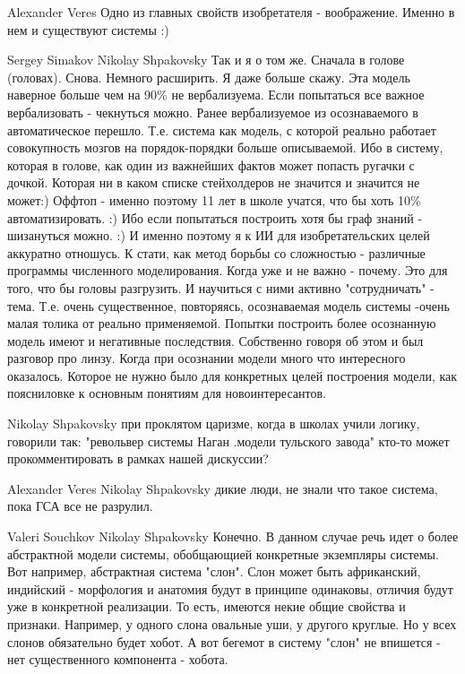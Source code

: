 \documentclass[11pt,a4paper]{article}
\begin{document}
Alexander Veres Одно из главных свойств изобретателя - воображение. Именно в
нем и существуют системы :)

Sergey Simakov Nikolay Shpakovsky Так и я о том же. Сначала в голове
(головах). Снова. Немного расширить.  Я даже больше скажу. Эта модель наверное
больше чем на 90\% не вербализуема. Если попытаться все важное вербализовать -
чекнуться можно. Ранее вербализуемое из осознаваемого в автоматическое
перешло. Т.е. система как модель, с которой реально работает совокупность
мозгов на порядок-порядки больше описываемой. Ибо в систему, которая в голове,
как один из важнейших фактов может попасть ругачки с дочкой. Которая ни в
каком списке стейхолдеров не значится и значится не может:) Оффтоп - именно
поэтому 11 лет в школе учатся, что бы хоть 10\% автоматизировать. :) Ибо если
попытаться построить хотя бы граф знаний - шизануться можно. :) И именно
поэтому я к ИИ для изобретательских целей аккуратно отношусь.  К стати, как
метод борьбы со сложностью - различные программы численного
моделирования. Когда уже и не важно - почему. Это для того, что бы головы
разгрузить. И научиться с ними активно "сотрудничать" - тема.  Т.е. очень
существенное, повторяясь, осознаваемая модель системы -очень малая толика от
реально применяемой.  Попытки построить более осознанную модель имеют и
негативные последствия. Собственно говоря об этом и был разговор про
линзу. Когда при осознании модели много что интересного оказалось. Которое не
нужно было для конкретных целей построения модели, как поясниловке к основным
понятиям для новоинтересантов.

Nikolay Shpakovsky при проклятом царизме, когда в школах учили логику,
говорили так: "револьвер системы Наган .модели тульского завода" кто-то может
прокомментировать в рамках нашей дискуссии?

Alexander Veres Nikolay Shpakovsky дикие люди, не знали что такое система,
пока ГСА все не разрулил.

Valeri Souchkov Nikolay Shpakovsky Конечно. В данном случае речь идет о более
абстрактной модели системы, обобщающией конкретные экземпляры системы. Вот
например, абстрактная система "слон". Слон может быть африканский, индийский -
морфология и анатомия будут в принципе одинаковы, отличия будут уже в
конкретной реализации. То есть, имеются некие общие свойства и
признаки. Например, у одного слона овальные уши, у другого круглые. Но у всех
слонов обязательно будет хобот. А вот бегемот в систему "слон" не впишется -
нет существенного компонента - хобота.
\end{document}

